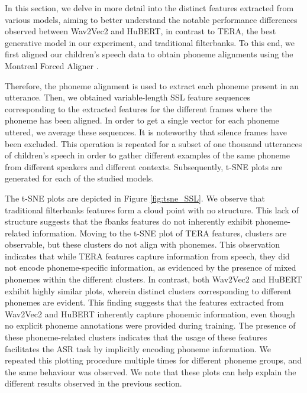 In this section, we delve in more detail into the distinct features extracted from various models, aiming to better understand the notable performance differences observed between Wav2Vec2 and HuBERT, in contrast to \ac{TERA}, the best generative model in our experiment, and traditional filterbanks. To this end, we first aligned our children's speech data to obtain phoneme alignments using the Montreal Forced Aligner \cite{mcauliffe2017montreal}. %

Therefore, the phoneme alignment is used to extract each phoneme present in an utterance. Then, we obtained variable-length \ac{SSL} feature sequences corresponding to the extracted features for the different frames where the phoneme has been aligned. In order to get a single vector for each phoneme uttered, we average these sequences. It is noteworthy that silence frames have been excluded. This operation is repeated for a subset of one thousand utterances of children's speech in order to gather different examples of the same phoneme from different speakers and different contexts. Subsequently, \ac{t-SNE} plots are generated for each of the studied models. 

The \ac{t-SNE} plots are depicted in Figure \ref{fig:tsne_SSL}. We observe that traditional filterbanks features form a cloud point with no structure. This lack of structure suggests that the \ac{fbanks} features do not inherently exhibit phoneme-related information.
Moving to the \ac{t-SNE} plot of \ac{TERA} features, clusters are observable, but these clusters do not align with phonemes. This observation indicates that while \ac{TERA} features capture information from speech, they did not encode phoneme-specific information, as evidenced by the presence of mixed phonemes within the different clusters.
In contrast, both Wav2Vec2 and HuBERT exhibit highly similar plots, wherein distinct clusters corresponding to different phonemes are evident. This finding suggests that the features extracted from Wav2Vec2 and HuBERT inherently capture phonemic information, even though no explicit phoneme annotations were provided during training. The presence of these phoneme-related clusters indicates that the usage of these features facilitates the \ac{ASR} task by implicitly encoding phoneme information. We repeated this plotting procedure multiple times for different phoneme groups, and the same behaviour was observed. We note that these plots can help explain the different results observed in the previous section.


